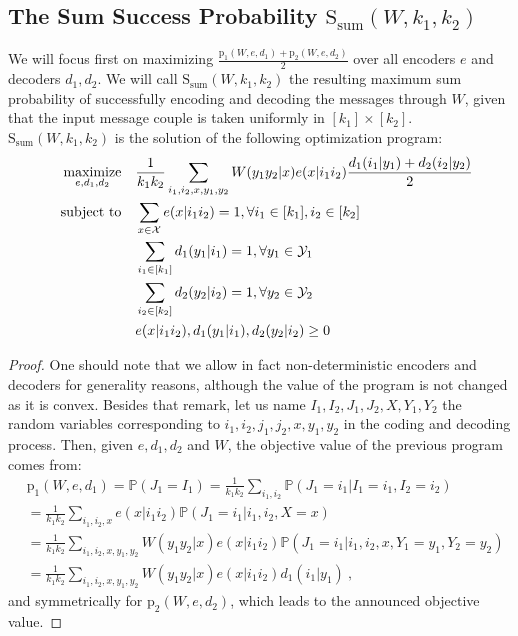 \subsection{The Sum Success Probability $\mathrm{S}_{\text{sum}}(W,k_1,k_2)$}
We will focus first on maximizing $\frac{\mathrm{p}_1(W,e,d_1)+\mathrm{p}_2(W,e,d_2)}{2}$ over all encoders $e$ and decoders $d_1,d_2$. We will call $\mathrm{S}_{\text{sum}}(W,k_1,k_2)$ the resulting maximum sum probability of successfully encoding and decoding the messages through $W$, given that the input message couple is taken uniformly in $[k_1] \times [k_2]$. $\mathrm{S}_{\text{sum}}(W,k_1,k_2)$ is the solution of the following optimization program:
\begin{equation}
  \begin{aligned}
    &&\underset{e,d_1,d_2}{\operatorname{\text{maximize}}} &&& \frac{1}{k_1k_2}\sum_{i_1,i_2,x,y_1,y_2} W(y_1y_2|x)e(x|i_1i_2)\frac{d_1(i_1|y_1) + d_2(i_2|y_2)}{2}\\
    &&\operatorname{\text{subject to}} &&& \sum_{x \in \mathcal{X}} e(x|i_1i_2) = 1, \forall i_1 \in [k_1], i_2 \in [k_2]\\
    &&&&& \sum_{i_1 \in [k_1]} d_1(y_1|i_1) = 1, \forall y_1 \in \mathcal{Y}_1\\
    &&&&& \sum_{i_2 \in [k_2]} d_2(y_2|i_2) = 1, \forall y_2 \in \mathcal{Y}_2\\
    &&&&& e(x|i_1i_2), d_1(y_1|i_1), d_2(y_2|i_2) \geq 0
  \end{aligned}
\end{equation}

\begin{proof}
One should note that we allow in fact non-deterministic encoders and decoders for generality reasons, although the value of the program is not changed as it is convex. Besides that remark, let us name $I_1,I_2,J_1,J_2,X,Y_1,Y_2$ the random variables corresponding to $i_1,i_2,j_1,j_2,x,y_1,y_2$ in the coding and decoding process. Then, given $e,d_1,d_2$ and $W$, the objective value of the previous program comes from:
\begin{equation}
  \begin{aligned}
    &\mathrm{p}_1(W,e,d_1) = \mathbb{P}\left(J_1 = I_1\right) = \frac{1}{k_1k_2}\sum_{i_1,i_2} \mathbb{P}\left(J_1 = i_1|I_1=i_1,I_2=i_2\right)\\
    &= \frac{1}{k_1k_2}\sum_{i_1,i_2,x}e(x|i_1i_2) \mathbb{P}\left(J_1 = i_1|i_1,i_2,X=x\right)\\
    &= \frac{1}{k_1k_2}\sum_{i_1,i_2,x,y_1,y_2}W(y_1y_2|x)e(x|i_1i_2) \mathbb{P}\left(J_1 = i_1|i_1,i_2,x,Y_1=y_1,Y_2=y_2\right)\\
    &= \frac{1}{k_1k_2}\sum_{i_1,i_2,x,y_1,y_2}W(y_1y_2|x)e(x|i_1i_2)d_1(i_1|y_1) \ ,
  \end{aligned}
\end{equation}
and symmetrically for $\mathrm{p}_2(W,e,d_2)$, which leads to the announced objective value.
\end{proof}

